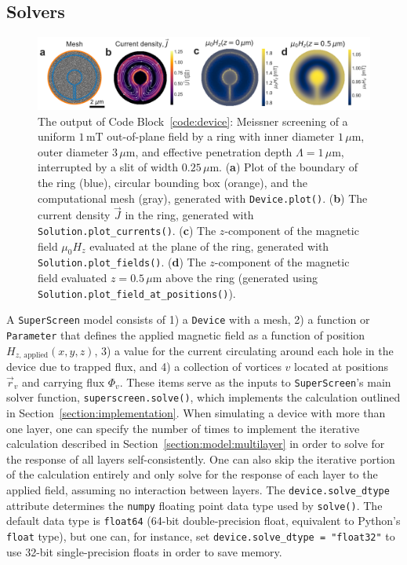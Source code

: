 \documentclass[final,3p,times,twocolumn]{elsarticle}
\newcommand{\inline}[1]{\texttt{#1}\xspace}
\newcommand{\SuperScreen}{\inline{SuperScreen}}
\newcommand{\um}{\mu\mathrm{m}}
\begin{document}
\subsection{Solvers}
\label{section:overview:solvers}
\begin{figure}
    \centering
    \includegraphics[width=\textwidth]{examples/images/ring_with_slit.pdf}
    \caption{The output of Code Block~\ref{code:device}: Meissner screening of a uniform $1\,\mathrm{mT}$ out-of-plane field by a ring with inner diameter $1\,\um$, outer diameter $3\,\um$, and effective penetration depth $\Lambda=1\,\um$, interrupted by a slit of width $0.25\,\um$. ({\bf a}) Plot of the boundary of the ring (blue), circular bounding box (orange), and the computational mesh (gray), generated with \inline{Device.plot()}. ({\bf b}) The current density $\vec{J}$ in the ring, generated with \inline{Solution.plot_currents()}. ({\bf c}) The $z$-component of the magnetic field $\mu_0H_z$ evaluated at the plane of the ring, generated with \inline{Solution.plot_fields()}. ({\bf d}) The $z$-component of the magnetic field evaluated $z=0.5\,\um$ above the ring (generated using \inline{Solution.plot_field_at_positions()}).}
    \label{fig:ring-with-slit}
\end{figure}

A \SuperScreen model consists of 1) a \inline{Device} with a mesh, 2) a function or \inline{Parameter} that defines the applied magnetic field as a function of position $H_{z,\,\mathrm{applied}}(x, y, z)$, 3) a value for the current circulating around each hole in the device due to trapped flux, and 4) a collection of vortices $v$ located at positions $\vec{r}_v$ and carrying flux $\Phi_v$. These items serve as the inputs to \SuperScreen's main solver function, \inline{superscreen.solve()}, which implements the calculation outlined in Section~\ref{section:implementation}. When simulating a device with more than one layer, one can specify the number of times to implement the iterative calculation described in Section~\ref{section:model:multilayer} in order to solve for the response of all layers self-consistently. One can also skip the iterative portion of the calculation entirely and only solve for the response of each layer to the applied field, assuming no interaction between layers. The \inline{device.solve_dtype} attribute determines the \inline{numpy} floating point data type used by \inline{solve()}. The default data type is \inline{float64} (64-bit double-precision float, equivalent to Python's \inline{float} type), but one can, for instance, set \inline{device.solve_dtype = "float32"} to use 32-bit single-precision floats in order to save memory.
\end{document}
